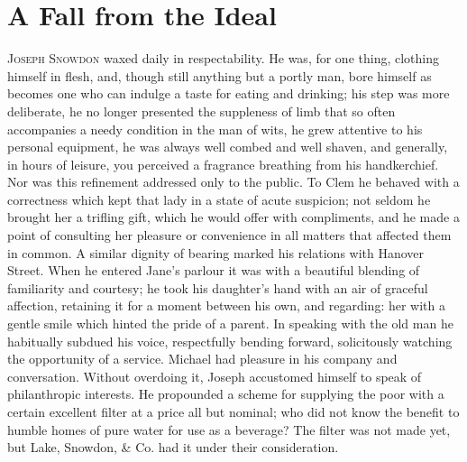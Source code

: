 \chapter{A Fall from the Ideal}

\textsc{Joseph Snowdon} waxed daily in respectability. He was, for one
thing, clothing himself in flesh, and, though still anything but a
portly man, bore himself as becomes one who can indulge a taste for
eating and drinking; his step was more deliberate, he no longer
presented the suppleness of limb that so often accompanies a needy
condition in the man of wits, he grew attentive to his personal
equipment, he was always well combed and well shaven, and generally, in
hours of leisure, you perceived a fragrance breathing from his
handkerchief. Nor was this refinement addressed only to the public. To
Clem he behaved with a correctness which kept that lady in a state of
acute suspicion; not seldom he brought her a trifling gift, which he
would offer with compliments, and he made a point of consulting her
{\protect\hypertarget{121}{}{}}pleasure or convenience in all matters
that affected them in common. A similar dignity of bearing marked his
relations with Hanover Street. When he entered Jane's parlour it was
with a beautiful blending of familiarity and courtesy; he took his
daughter's hand with an air of graceful affection, retaining it for a
moment between his own, and regarding: her with a gentle smile which
hinted the pride of a parent. In speaking with the old man he habitually
subdued his voice, respectfully bending forward, solicitously watching
the opportunity of a service. Michael had pleasure in his company and
conversation. Without overdoing it, Joseph accustomed himself to speak
of philanthropic interests. He propounded a scheme for supplying the
poor with a certain excellent filter at a price all but nominal; who did
not know the benefit to humble homes of pure water for use as a
beverage? The filter was not made yet, but Lake, Snowdon, \& Co. had it
under their consideration.

